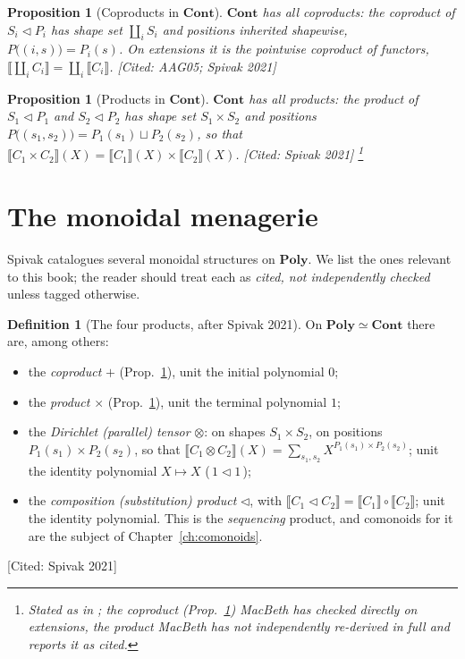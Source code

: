 \documentclass[11pt,a4paper]{book}
\newcommand{\Cont}{\mathbf{Cont}}
\newcommand{\Poly}{\mathbf{Poly}}
\newcommand{\cont}[2]{#1 \triangleleft #2}
\newcommand{\Ext}[1]{\llbracket #1 \rrbracket}
\theoremstyle{plain}
\newtheorem{Proposition}[Theorem]{Proposition}
\theoremstyle{definition}
\newtheorem{Definition}[Theorem]{Definition}
\theoremstyle{remark}
\newcommand{\prov}[1]{\hfill\textsf{\footnotesize[#1]}}
\begin{document}
\begin{Proposition}[Coproducts in $\Cont$]\label{prop:coprod}
$\Cont$ has all coproducts: the coproduct of $\cont{S_i}{P_i}$ has shape set
$\coprod_i S_i$ and positions inherited shapewise,
$P\bigl((i,s)\bigr)=P_i(s)$. On extensions it is the pointwise coproduct of
functors, $\Ext{\coprod_i C_i}=\coprod_i\Ext{C_i}$.
\prov{Cited: AAG05; Spivak 2021}
\end{Proposition}

\begin{Proposition}[Products in $\Cont$]\label{prop:prod}
$\Cont$ has all products: the product of $\cont{S_1}{P_1}$ and $\cont{S_2}{P_2}$
has shape set $S_1\times S_2$ and positions
$P\bigl((s_1,s_2)\bigr)=P_1(s_1)\sqcup P_2(s_2)$, so that
$\Ext{C_1\times C_2}(X)=\Ext{C_1}(X)\times\Ext{C_2}(X)$.
\prov{Cited: Spivak 2021}%
\footnote{Stated as in \cite{Spivak21}; the coproduct (Prop.~\ref{prop:coprod})
MacBeth has checked directly on extensions, the product MacBeth has \emph{not}
independently re-derived in full and reports it as cited.}
\end{Proposition}

\section{The monoidal menagerie}

Spivak \cite{Spivak21} catalogues several monoidal structures on $\Poly$. We list
the ones relevant to this book; the reader should treat each as
\emph{cited, not independently checked} unless tagged otherwise.

\begin{Definition}[The four products, after Spivak 2021]\label{def:menagerie}
On $\Poly\simeq\Cont$ there are, among others:
\begin{itemize}[nosep]
  \item the \emph{coproduct} $+$ (Prop.~\ref{prop:coprod}), unit the initial
        polynomial $0$;
  \item the \emph{product} $\times$ (Prop.~\ref{prop:prod}), unit the terminal
        polynomial $1$;
  \item the \emph{Dirichlet (parallel) tensor} $\otimes$: on shapes
        $S_1\times S_2$, on positions $P_1(s_1)\times P_2(s_2)$, so that
        $\Ext{C_1\otimes C_2}(X)=\sum_{s_1,s_2}X^{P_1(s_1)\times P_2(s_2)}$; unit
        the identity polynomial $X\mapsto X$ (\,$1\triangleleft 1$\,);
  \item the \emph{composition (substitution) product} $\triangleleft$, with
        $\Ext{C_1\triangleleft C_2}=\Ext{C_1}\circ\Ext{C_2}$; unit the identity
        polynomial. This is the \emph{sequencing} product, and comonoids for it
        are the subject of Chapter~\ref{ch:comonoids}.
\end{itemize}
\prov{Cited: Spivak 2021}
\end{Definition}
\end{document}
